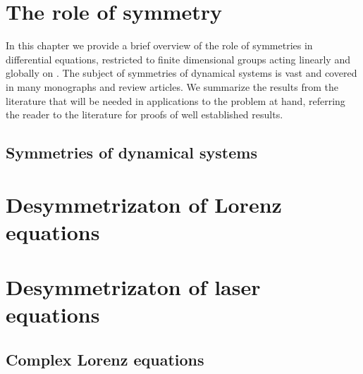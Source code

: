 \chapter{The role of symmetry}\label{chap:Symmetry}

In this chapter we provide a brief overview of the role of
symmetries in differential equations, restricted to finite
dimensional groups acting linearly and globally on . The
subject of symmetries of dynamical systems is vast and covered
in many monographs and review articles. We summarize the
results from the literature that will be needed in applications
to the problem at hand, referring the reader to the literature
for proofs of well established results.

 \section{Symmetries of dynamical systems}
        \label{sec:symIntro}
        

%        

%        

\chapter{Desymmetrizaton of Lorenz equations}
\label{chap:Lorenz}
    

\chapter{Desymmetrizaton of laser equations}
\label{chap:lasers}

 \section{Complex Lorenz equations}
    \label{sec:CLe}
    

